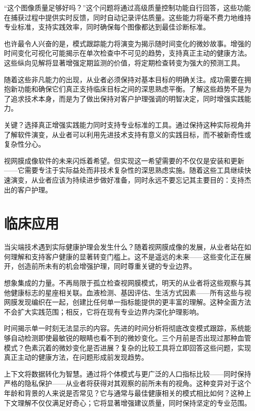 \documentclass[
  Letterpaper,
]{scrbook}
\begin{document}
``这个图像质量足够好吗？''这个问题将通过高级质量控制功能自行回答，这些功能在捕获过程中提供实时反馈，同时自动记录评估质量。这些能力将毫不费力地维持专业标准，支持实践效率，同时确保每个图像都达到最佳诊断标准。

也许最令人兴奋的是，模式跟踪能力将演变为揭示随时间变化的微妙故事。增强的时间变化可视化可能揭示在单次检查中不可见的趋势，支持真正主动的健康方法。这些纵向见解将显著增强定期监测的价值，将定期检查转变为强大的预测工具。

随着这些非凡能力的出现，从业者必须保持对基本目标的明确关注。成功需要在拥抱新功能和确保它们真正支持临床目标之间的深思熟虑平衡。了解这些趋势不是为了追求技术本身，而是为了做出保持对客户护理强调的明智决定，同时增强实践能力。

关键？选择真正增强实践能力同时支持专业标准的工具。通过保持这种实际视角并了解软件演变，从业者可以利用先进技术支持有意义的实践目标，而不被新奇性或复杂性分心。

视网膜成像软件的未来闪烁着希望。但实现这一希望需要的不仅仅是安装和更新------它需要专注于实际益处而非技术复杂性的深思熟虑实施。随着这些工具继续快速演变，从业者应该为持续进步做好准备，同时永远不要忘记其主要目的：支持杰出的客户护理。

\section{临床应用}\label{ux4e34ux5e8aux5e94ux7528}

当尖端技术遇到实际健康护理会发生什么？随着视网膜成像的发展，从业者站在如何理解和支持客户健康的显著转变门槛上。这不是遥远的未来------这些变化正在展开，创造前所未有的机会增强护理，同时尊重关键的专业边界。

想象集成的力量。不再局限于孤立检查视网膜模式，明天的从业者将这些观察与其他健康标志的星座相关联。血液检测、基因评估、生活方式因素------所有这些与视网膜发现编织在一起，创建比任何单一指标能提供的更丰富的理解。这种全面方法不会扩大实践范围；相反，它将在现有专业边界内深化护理影响。

时间揭示单一时刻无法显示的内容。先进的时间分析将彻底改变模式跟踪，系统能够自动检测即使最敏锐的眼睛也看不到的微妙变化。三个月前是否出现过那种血管模式？色素沉着的微妙变化是否进展？复杂的比较工具将立即回答这些问题，实现真正主动的健康方法，在问题形成前发现趋势。

上下文将数据转化为智慧。通过将个体模式与更广泛的人口指标比较------同时保持严格的隐私保护------从业者将获得对其观察的前所未有的视角。这种变异对于这个年龄和背景的人来说是否常见？它与通常与最佳健康相关的模式相比如何？这种上下文理解不仅仅满足好奇心；它将显著增强建议质量，同时保持坚定的专业范围。
\end{document}
